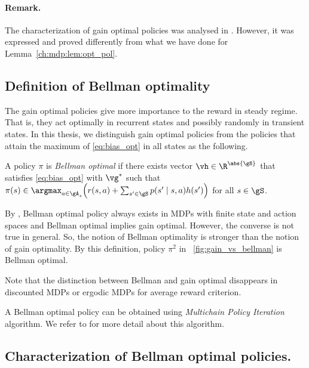 \paragraph{Remark.} The characterization of gain optimal policies was analysed in \cite{puterman2014markov, schweitzer1978functional}.
However, it was expressed and proved differently from what we have done for Lemma~\ref{ch:mdp:lem:opt_pol}.

\subsection{Definition of Bellman optimality}

The gain optimal policies give more importance to the reward in steady regime. 
That is, they act optimally in recurrent states and possibly randomly in transient states.
In this thesis, we distinguish gain optimal policies from the policies that attain the maximum of \eqref{eq:bias_opt} in all states as the following.
\begin{defn}
    \label{defn:bellman}
    A policy $\pi$ is \emph{Bellman optimal} if there exists vector $\vh\in\R^{\abs{\gS}}$ that satisfies \eqref{eq:bias_opt} with $\vg^*$ such that $\pi(s)\in\argmax_{a\in\gA_s}\Big(r(s,a) +\sum_{s'\in\gS}p(s'\mid s,a)h(s')\Big)$ for all $s\in\gS$.
\end{defn}
By \cite[Theorem~9.1.7]{puterman2014markov}, Bellman optimal policy always exists in MDPs with finite state and action spaces and Bellman optimal implies gain optimal.
However, the converse is not true in general.
So, the notion of Bellman optimality is stronger than the notion of gain optimality.
By this definition, policy $\pi^2$ in \figurename~\ref{fig:gain_vs_bellman} is Bellman optimal.

Note that the distinction between Bellman and gain optimal disappears in discounted MDPs or ergodic MDPs for average reward criterion.

A Bellman optimal policy can be obtained using \emph{Multichain Policy Iteration} algorithm.
We refer to \cite[Section~9.2.1]{puterman2014markov} for more detail about this algorithm.


\subsection{Characterization of Bellman optimal policies.}

